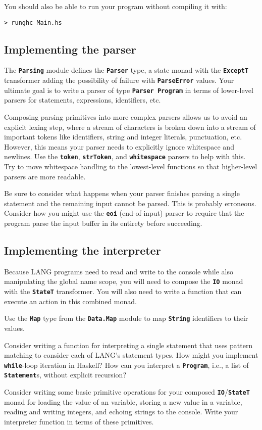 \documentclass[12pt]{article}
\newcommand\code[1]{\texttt{\textbf{#1}}}
\begin{document}
You should also be able to run your program without compiling it with:

\begin{lstlisting}
> runghc Main.hs
\end{lstlisting}

\subsection{Implementing the parser}

The \code{Parsing} module defines the \code{Parser} type, a state monad with the \code{ExceptT}
transformer adding the possibility of failure with \code{ParseError} values. Your ultimate goal is to
write a parser of type \code{Parser Program} in terms of lower-level parsers for statements, expressions,
identifiers, etc.

Composing parsing primitives into more complex parsers allows us to avoid an explicit lexing step,
where a stream of characters is broken down into a stream of important tokens like identifiers, string and 
integer literals, punctuation, etc. However, this means your parser needs to explicitly ignore 
whitespace and newlines. Use the \code{token}, \code{strToken}, and \code{whitespace} parsers
to help with this. Try to move whitespace handling to the lowest-level functions so that higher-level
parsers are more readable.

Be sure to consider what happens when your parser finishes parsing a single statement and the remaining
input cannot be parsed. This is probably erroneous. Consider how you might use the \code{eoi} (end-of-input)
parser to require that the program parse the input buffer in its entirety before succeeding.

\subsection{Implementing the interpreter}

Because LANG programs need to read and write to the console while also manipulating the global
name scope, you will need to compose the \code{IO} monad with the \code{StateT} transformer.
You will also need to write a function that can execute an action in this combined monad.

Use the \code{Map} type from the \code{Data.Map} module to map \code{String} identifiers to their
values.

Consider writing a function for interpreting a single statement that uses pattern matching to
consider each of LANG's statement types. How might you implement \code{while}-loop iteration
in Haskell? How can you interpret a \code{Program}, i.e., a list of \code{Statement}s, without
explicit recursion?

Consider writing some basic primitive operations for your composed \code{IO}/\code{StateT} monad
for loading the value of an variable, storing a new value in a variable, reading and writing 
integers, and echoing strings to the console. Write your interpreter function in terms of these
primitives.
\end{document}
